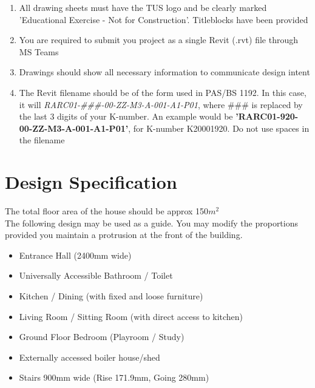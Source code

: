 \begin{enumerate}
	\item All drawing sheets must have the TUS logo and be clearly marked 'Educational Exercise - Not for Construction'.  Titleblocks have been provided
	\item You are required to submit you project as a single Revit (.rvt) file through MS Teams
	\item Drawings should show all necessary information to communicate design intent
	\item The Revit filename should be of the form used in PAS/BS 1192.  In this case, it will \textit{RARC01-\#\#\#-00-ZZ-M3-A-001-A1-P01}, where \#\#\# is replaced by the last 3 digits of your K-number. An example would be \textbf{'RARC01-920-00-ZZ-M3-A-001-A1-P01'}, for K-number K20001920.  Do not use spaces in the filename
\end{enumerate}


\newpage

\section*{Design Specification}



The total floor area of the house should be approx 150$m^2$\\

The following design may be used as a guide.  You may modify the proportions provided you maintain a protrusion at the front of the building.


\begin{itemize}
	\item Entrance Hall (2400mm wide)
	\item Universally Accessible Bathroom / Toilet
	\item Kitchen / Dining (with fixed and loose furniture)
	\item Living Room / Sitting Room (with direct access to kitchen)
	\item Ground Floor Bedroom (Playroom / Study)
	\item Externally accessed boiler house/shed
	\item Stairs 900mm wide (Rise 171.9mm, Going 280mm)
\end{itemize}



